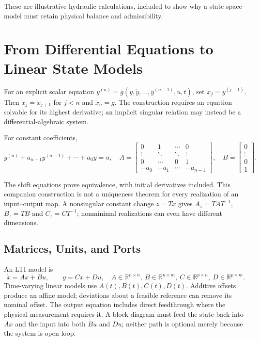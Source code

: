 These are illustrative hydraulic calculations, included to show why a state-space model must retain physical balance and admissibility.

\section{From Differential Equations to Linear State Models}
\label{sec:ode_conversion}
\label{thm:nth_order_conversion}

For an explicit scalar equation $y^{(n)}=g(y,\dot y,\ldots,y^{(n-1)},u,t)$, set $x_j=y^{(j-1)}$. Then $\dot x_j=x_{j+1}$ for $j<n$ and $\dot x_n=g$. The construction requires an equation solvable for its highest derivative; an implicit singular relation may instead be a differential-algebraic system.

For constant coefficients,
\begin{equation}
\label{eq:companion_model}
 y^{(n)}+a_{n-1}y^{(n-1)}+\cdots+a_0y=u,
 \quad
 A=\begin{bmatrix}0&1&\cdots&0\\\vdots&\ddots&\ddots&\vdots\\0&\cdots&0&1\\-a_0&-a_1&\cdots&-a_{n-1}\end{bmatrix},
 \quad B=\begin{bmatrix}0\\\vdots\\0\\1\end{bmatrix}.
\end{equation}

The shift equations prove equivalence, with initial derivatives included. This companion construction is not a uniqueness theorem for every realization of an input--output map. A nonsingular constant change $z=Tx$ gives $A_z=TAT^{-1}$, $B_z=TB$ and $C_z=CT^{-1}$; nonminimal realizations can even have different dimensions.

\subsection{Matrices, Units, and Ports}
\label{sec:linear_state_space}

An LTI model is
\begin{equation}
\label{eq:linear_state_space}
 \dot x=Ax+Bu,\qquad y=Cx+Du,
 \quad A\in\mathbb R^{n\times n},\ B\in\mathbb R^{n\times m},\ C\in\mathbb R^{p\times n},\ D\in\mathbb R^{p\times m}.
\end{equation}
\label{eq:output_standard}
\label{def:output_eq}
Time-varying linear models use $A(t),B(t),C(t),D(t)$. Additive offsets produce an affine model; deviations about a feasible reference can remove its nominal offset. The output equation includes direct feedthrough where the physical measurement requires it. A block diagram must feed the state back into $Ax$ and the input into both $Bu$ and $Du$; neither path is optional merely because the system is open loop.

